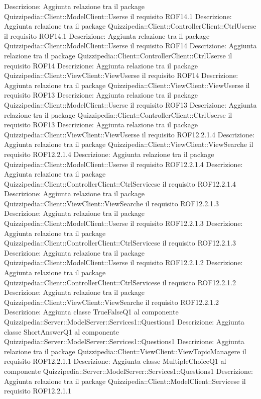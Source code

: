 Descrizione: Aggiunta relazione tra il package Quizzipedia::Client::ModelClient::Userse il requisito ROF14.1 
Descrizione: Aggiunta relazione tra il package Quizzipedia::Client::ControllerClient::CtrlUserse il requisito ROF14.1 
Descrizione: Aggiunta relazione tra il package Quizzipedia::Client::ModelClient::Userse il requisito ROF14 
Descrizione: Aggiunta relazione tra il package Quizzipedia::Client::ControllerClient::CtrlUserse il requisito ROF14 
Descrizione: Aggiunta relazione tra il package Quizzipedia::Client::ViewClient::ViewUserse il requisito ROF14 
Descrizione: Aggiunta relazione tra il package Quizzipedia::Client::ViewClient::ViewUserse il requisito ROF13 
Descrizione: Aggiunta relazione tra il package Quizzipedia::Client::ModelClient::Userse il requisito ROF13 
Descrizione: Aggiunta relazione tra il package Quizzipedia::Client::ControllerClient::CtrlUserse il requisito ROF13 
Descrizione: Aggiunta relazione tra il package Quizzipedia::Client::ViewClient::ViewUserse il requisito ROF12.2.1.4 
Descrizione: Aggiunta relazione tra il package Quizzipedia::Client::ViewClient::ViewSearche il requisito ROF12.2.1.4 
Descrizione: Aggiunta relazione tra il package Quizzipedia::Client::ModelClient::Userse il requisito ROF12.2.1.4 
Descrizione: Aggiunta relazione tra il package Quizzipedia::Client::ControllerClient::CtrlServicese il requisito ROF12.2.1.4 
Descrizione: Aggiunta relazione tra il package Quizzipedia::Client::ViewClient::ViewSearche il requisito ROF12.2.1.3 
Descrizione: Aggiunta relazione tra il package Quizzipedia::Client::ModelClient::Userse il requisito ROF12.2.1.3 
Descrizione: Aggiunta relazione tra il package Quizzipedia::Client::ControllerClient::CtrlServicese il requisito ROF12.2.1.3 
Descrizione: Aggiunta relazione tra il package Quizzipedia::Client::ModelClient::Userse il requisito ROF12.2.1.2 
Descrizione: Aggiunta relazione tra il package Quizzipedia::Client::ControllerClient::CtrlServicese il requisito ROF12.2.1.2 
Descrizione: Aggiunta relazione tra il package Quizzipedia::Client::ViewClient::ViewSearche il requisito ROF12.2.1.2 
Descrizione: Aggiunta classe TrueFalseQ1 al componente Quizzipedia::Server::ModelServer::Services1::Questions1 
Descrizione: Aggiunta classe ShortAnswerQ1 al componente Quizzipedia::Server::ModelServer::Services1::Questions1 
Descrizione: Aggiunta relazione tra il package Quizzipedia::Client::ViewClient::ViewTopicManagere il requisito ROF12.2.1.1 
Descrizione: Aggiunta classe MultipleChoiceQ1 al componente Quizzipedia::Server::ModelServer::Services1::Questions1 
Descrizione: Aggiunta relazione tra il package Quizzipedia::Client::ModelClient::Servicese il requisito ROF12.2.1.1 
